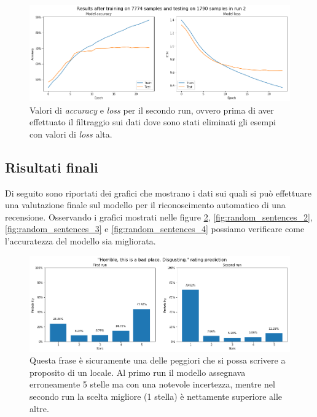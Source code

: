 \documentclass[12pt]{article}
\begin{document}
\begin{figure}[H]
\centering
\includegraphics[width=\textwidth]{images/accuracy_loss_run2.png}
\caption{Valori di \textit{accuracy} e \textit{loss} per il secondo run, ovvero prima di aver effettuato il filtraggio sui dati dove sono stati eliminati gli esempi con valori di \textit{loss} alta.}
\label{fig:run2}
\end{figure}

\subsection{Risultati finali}
Di seguito sono riportati dei grafici che mostrano i dati sui quali si può effettuare una valutazione finale sul modello per il riconoscimento automatico di una recensione. \newline
Osservando i grafici mostrati nelle figure \ref{fig:random_sentences_1}, \ref{fig:random_sentences_2}, \ref{fig:random_sentences_3} e \ref{fig:random_sentences_4} possiamo verificare come l'accuratezza del modello sia migliorata.
\begin{figure}[H]
\centering
\includegraphics[width=\textwidth]{images/sent1.png}
\caption{Questa frase è sicuramente una delle peggiori che si possa scrivere a proposito di un locale. Al primo run il modello assegnava erroneamente 5 stelle ma con una notevole incertezza, mentre nel secondo run la scelta migliore (1 stella) è nettamente superiore alle altre.}
\label{fig:random_sentences_1}
\end{figure}
\end{document}
